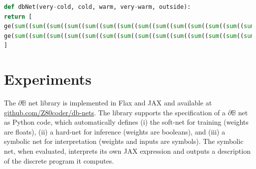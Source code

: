 \documentclass{article}
\theoremstyle{plain}
\theoremstyle{definition}
\theoremstyle{remark}
\begin{document}
\begin{lstlisting}[language=Python,style=mystyle,frame=single]
def dbNet(very-cold, cold, warm, very-warm, outside):
return [
ge(sum((sum((sum((sum((sum((sum((sum((sum((sum((sum((sum((sum((sum((sum((sum((sum((sum((sum((sum((sum((0, not(xor(ne(very-cold, 0), w1)))), not(xor(ne(cold, 0), w2)))), not(xor(ne(warm, 0), w3)))), not(xor(ne(very-warm, 0), w4)))), not(xor(ne(outside, 0), w5)))), not(xor(ne(very-cold, 0), w6)))), not(xor(ne(cold, 0), w7)))), not(xor(ne(warm, 0), w8)))), not(xor(ne(very-warm, 0), w9)))), not(xor(ne(outside, 0), w10)))), not(xor(ne(very-cold, 0), w11)))), not(xor(ne(cold, 0), w12)))), not(xor(ne(warm, 0), w13)))), not(xor(ne(very-warm, 0), w14)))), not(xor(ne(outside, 0), w15)))), not(xor(ne(very-cold, 0), w16)))), not(xor(ne(cold, 0), w17)))), not(xor(ne(warm, 0), w18)))), not(xor(ne(very-warm, 0), w19)))), not(xor(ne(outside, 0), w20)))), 11),
ge(sum((sum((sum((sum((sum((sum((sum((sum((sum((sum((sum((sum((sum((sum((sum((sum((sum((sum((sum((sum((0, not(xor(ne(very-cold, 0), w21)))), not(xor(ne(cold, 0), w22)))), not(xor(ne(warm, 0), w23)))), not(xor(ne(very-warm, 0), w24)))), not(xor(ne(outside, 0), w25)))), not(xor(ne(very-cold, 0), w26)))), not(xor(ne(cold, 0), w27)))), not(xor(ne(warm, 0), w28)))), not(xor(ne(very-warm, 0), w29)))), not(xor(ne(outside, 0), w30)))), not(xor(ne(very-cold, 0), w31)))), not(xor(ne(cold, 0), w32)))), not(xor(ne(warm, 0), w33)))), not(xor(ne(very-warm, 0), w34)))), not(xor(ne(outside, 0), w35)))), not(xor(ne(very-cold, 0), w36)))), not(xor(ne(cold, 0), w37)))), not(xor(ne(warm, 0), w38)))), not(xor(ne(very-warm, 0), w39)))), not(xor(ne(outside, 0), w40)))), 11)
]
\end{lstlisting}

\section{Experiments}\label{sec:experiments}

The $\partial\mathbb{B}$ net library is implemented in Flax \cite{flax2020github} and JAX \cite{jax2018github} and available at {\small \url{github.com/Z80coder/db-nets}}. The library supports the specification of a $\partial\mathbb{B}$ net as Python code, which automatically defines (i) the soft-net for training (weights are floats), (ii) a hard-net for inference (weights are booleans), and (iii) a symbolic net for interpretation (weights and inputs are symbols). The symbolic net, when evaluated, interprets its own JAX expression and outputs a description of the discrete program it computes.
\end{document}
